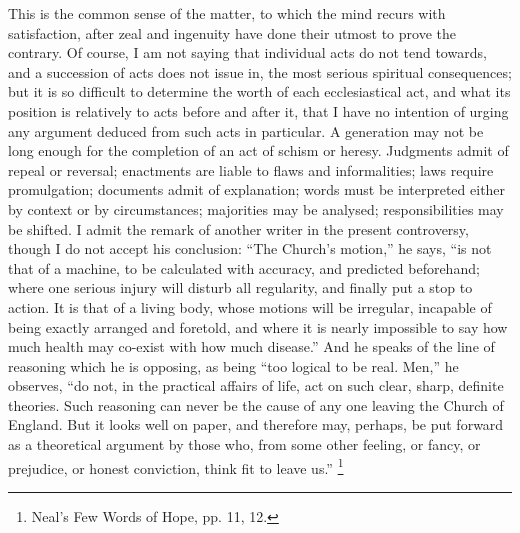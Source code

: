 This is the common sense of the matter, to which the mind recurs
with satisfaction, after zeal and ingenuity have done their utmost to
prove the contrary. Of course, I am not saying that individual acts do
not tend towards, and a succession of acts does not issue in, the most
serious spiritual consequences; but it is so difficult to determine
the worth of each ecclesiastical act, and what its position is
relatively to acts before and after it, that I have no intention of
urging any argument deduced from such acts in particular. A generation
may not be long enough for the completion of an act of schism or
heresy. Judgments admit of repeal or reversal; enactments are liable
to flaws and informalities; laws require promulgation; documents admit
of explanation; words must be interpreted either by context or by
circumstances; majorities may be analysed; responsibilities may be
shifted. I admit the remark of another writer in the present
controversy, though I do not accept his conclusion: ``The Church's
motion,'' he says, ``is not that of a machine, to be
calculated with accuracy, and predicted beforehand; where one serious
injury will disturb all regularity, and finally put a stop to action.
It is that of a living body, whose motions will be irregular,
incapable of being exactly arranged and foretold, and where it is
nearly impossible to say how much health may co-exist with how much
disease.'' And he speaks of the line of reasoning which he is
opposing, as being ``too logical to be real. Men,'' he
observes, ``do not, in the practical affairs of life, act on such
clear, sharp, definite theories. Such reasoning can never be the cause
of any one leaving the Church of England. But it looks well on paper,
and therefore may, perhaps, be put forward as a theoretical argument
by those who, from some other feeling, or fancy, or prejudice, or
honest conviction, think fit to leave us.'' \footnote{Neal's Few Words of Hope, pp. 11, 12.}

